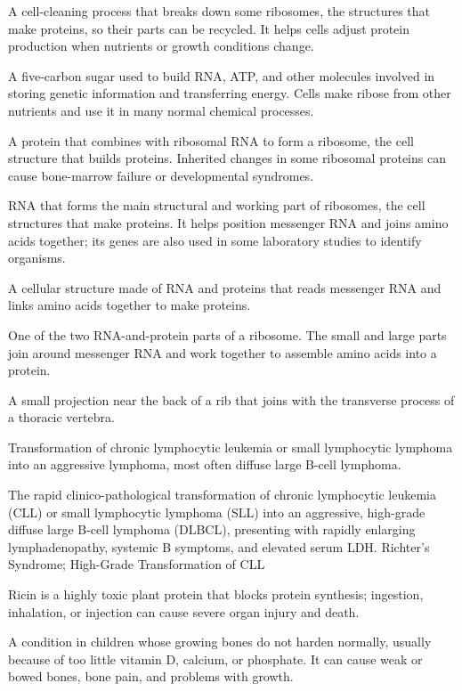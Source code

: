  A cell-cleaning process that breaks down some ribosomes, the structures that make proteins, so their parts can be recycled. It helps cells adjust protein production when nutrients or growth conditions change.

 A five-carbon sugar used to build RNA, ATP, and other molecules involved in storing genetic information and transferring energy. Cells make ribose from other nutrients and use it in many normal chemical processes.

 A protein that combines with ribosomal RNA to form a ribosome, the cell structure that builds proteins. Inherited changes in some ribosomal proteins can cause bone-marrow failure or developmental syndromes.

 RNA that forms the main structural and working part of ribosomes, the cell structures that make proteins. It helps position messenger RNA and joins amino acids together; its genes are also used in some laboratory studies to identify organisms.

 A cellular structure made of RNA and proteins that reads messenger RNA and links amino acids together to make proteins.

 One of the two RNA-and-protein parts of a ribosome. The small and large parts join around messenger RNA and work together to assemble amino acids into a protein.

 A small projection near the back of a rib that joins with the transverse process of a thoracic vertebra.

 Transformation of chronic lymphocytic leukemia or small lymphocytic lymphoma into an aggressive lymphoma, most often diffuse large B-cell lymphoma.

 The rapid clinico-pathological transformation of chronic lymphocytic leukemia (CLL) or small lymphocytic lymphoma (SLL) into an aggressive, high-grade diffuse large B-cell lymphoma (DLBCL), presenting with rapidly enlarging lymphadenopathy, systemic B symptoms, and elevated serum LDH.
\synonyms
Richter's Syndrome; High-Grade Transformation of CLL

 Ricin is a highly toxic plant protein that blocks protein synthesis; ingestion, inhalation, or injection can cause severe organ injury and death.

 A condition in children whose growing bones do not harden normally, usually because of too little vitamin D, calcium, or phosphate. It can cause weak or bowed bones, bone pain, and problems with growth.

